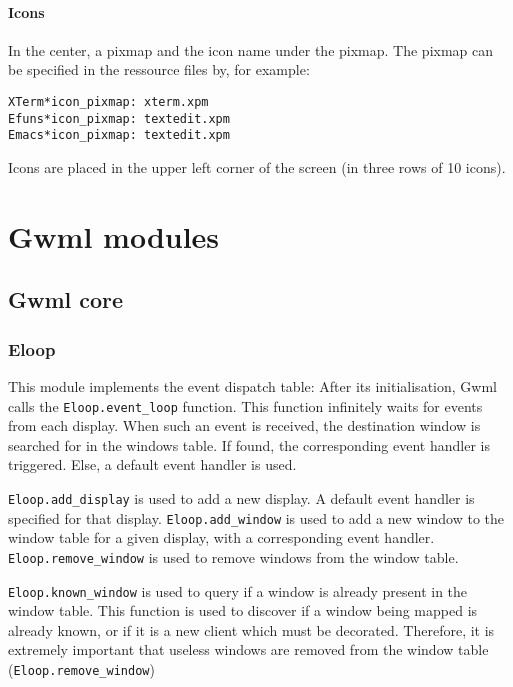 \documentclass{book}
\begin{document}
  \subsubsection{Icons}

In the center, a pixmap and the icon name under the pixmap.
The pixmap can be specified in the ressource files by, for example:

\begin{verbatim}
XTerm*icon_pixmap: xterm.xpm
Efuns*icon_pixmap: textedit.xpm
Emacs*icon_pixmap: textedit.xpm
\end{verbatim}

 Icons are placed in the upper left corner of the screen (in three rows of
10 icons).


\chapter{Gwml modules}

\section{Gwml core}

\subsection{\bf Eloop}

 This module implements the event dispatch table: After
     its initialisation, Gwml calls the {\tt Eloop.event\_loop} function.
   This function infinitely waits for events from each display.
   When such an event is received, the destination window is searched for 
   in the windows table. If found, the corresponding event handler is triggered.
   Else, a default event handler is used.

 {\tt Eloop.add\_display} is used to add a new display. A default event
handler is specified for that display. {\tt Eloop.add\_window} is used to
add a new window to the window table for a given display, with a
corresponding event handler. {\tt Eloop.remove\_window} is used
to remove windows from the window table.

{\tt Eloop.known\_window} is used to query if a window is already present in
the window table. This function is used to discover if a window being 
mapped is already known, or if it is a new client which must be decorated.
Therefore, it is extremely important that useless windows are removed from
the window table ({\tt Eloop.remove\_window})
\end{document}

